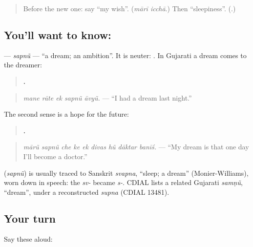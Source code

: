 \label{lesson:GU-C281-sapnu}



\begin{quote}
Before the new one: say \textquotedblleft{}my wish\textquotedblright{}. (\emph{mārī icchā}.) Then \textquotedblleft{}sleepiness\textquotedblright{}. (\textbf{}.)
\end{quote}

\subsection*{You'll want to know: }
\textbf{} — \emph{sapnũ} — \textquotedblleft{}a dream; an ambition\textquotedblright{}. It is neuter: \textbf{ }. In Gujarati a dream comes to the dreamer:

\begin{quote}
\textbf{    .}
\end{quote}

\begin{quote}
\emph{mane rāte ek sapnũ āvyũ.} — \textquotedblleft{}I had a dream last night.\textquotedblright{}
\end{quote}

The second sense is a hope for the future:

\begin{quote}
\textbf{        .}
\end{quote}

\begin{quote}
\emph{mārũ sapnũ che ke ek divas hũ dāktar banīś.} — \textquotedblleft{}My dream is that one day I'll become a doctor.\textquotedblright{}
\end{quote}

\begin{cousinweb}
\textbf{} (\emph{sapnũ}) is usually traced to Sanskrit \emph{svapna}, \textquotedblleft{}sleep; a dream\textquotedblright{} (Monier-Williams), worn down in speech: the \emph{sv-} became \emph{s-}. CDIAL lists a related Gujarati \emph{samṇũ}, \textquotedblleft{}dream\textquotedblright{}, under a reconstructed \emph{supna} (CDIAL 13481).
\end{cousinweb}

\subsection*{Your turn}
Say these aloud:

